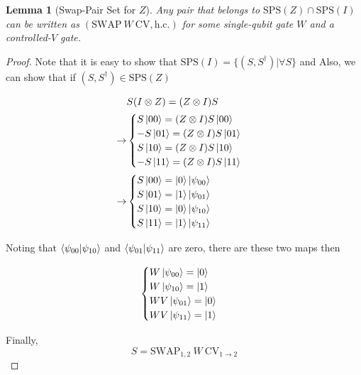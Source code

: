 \documentclass{report}
\newtheorem{lemma}{Lemma}
\begin{document}
\begin{lemma}[Swap-Pair Set for $Z$]
  Any pair that belongs to $\mathrm{SPS}(Z) \cap \mathrm{SPS}(I)$ 
  can be written as $(\mathrm{SWAP} ~ W ~ \mathrm{CV}, \text{h.c.})$ for some single-qubit gate $W$ and a controlled-$V$ gate.
\end{lemma}
\begin{proof}
Note that it is easy to show that $\mathrm{SPS}(I) = \{ (S, S^\dagger) | \forall S \}$ and 
Also, we can show that if $(S, S^\dagger) \in \mathrm{SPS}(Z)$

\begin{equation}
  \begin{aligned}
  &S(I \otimes Z) = (Z \otimes I) S \\
  \rightarrow &\begin{cases}
    S\ket{00} = (Z \otimes I) S\ket{00} \\
    - S\ket{01} = (Z \otimes I) S\ket{01} \\
    S\ket{10} = (Z \otimes I) S\ket{10} \\
    - S\ket{11} = (Z \otimes I) S\ket{11}
  \end{cases} \\
  \rightarrow &\begin{cases}
    S\ket{00} = \ket{0}\ket{\psi_{00}} \\
    S\ket{01} = \ket{1}\ket{\psi_{01}} \\
    S\ket{10} = \ket{0}\ket{\psi_{10}} \\
    S\ket{11} = \ket{1}\ket{\psi_{11}}
  \end{cases} \\
  \end{aligned}
\end{equation}

Noting that $\braket{\psi_{00}}{\psi_{10}}$ and $\braket{\psi_{01}}{\psi_{11}}$ are zero, there are these two maps then

\begin{equation}
  \begin{cases}
  W\ket{\psi_{00}} = \ket{0} \\
  W\ket{\psi_{10}} = \ket{1} \\
  WV\ket{\psi_{01}} = \ket{0} \\
  WV\ket{\psi_{11}} = \ket{1}
  \end{cases}
\end{equation}

Finally, 
\begin{equation}
  S = \mathrm{SWAP}_{1,2} ~ W ~ \mathrm{CV}_{1\to 2}
\end{equation}
\end{proof}
\end{document}
